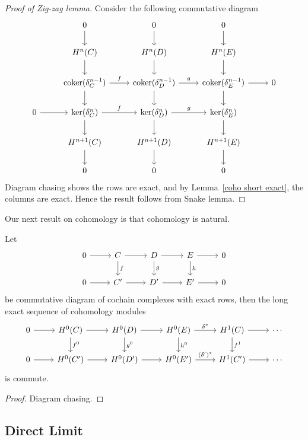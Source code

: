 \begin{proof}[Proof of Zig-zag lemma]
    Consider the following commutative diagram
    \[\begin{tikzcd}
        {} & 0 \ar[d] & 0 \ar[d] & 0 \ar[d] & {}\\
        {} & H^n(C) \ar[d] & H^n(D) \ar[d] & H^n(E) \ar[d] & {}\\
        {} & \coker(\delta^{n-1}_C) \ar[r, "f"] \ar[d] & \coker(\delta^{n-1}_D) \ar[r, "g"] \ar[d] & \coker(\delta^{n-1}_E) \ar[r] \ar[d] & 0 \\
        0 \ar[r] & \ker(\delta^n_C) \ar[r, "f"] \ar[d] & \ker(\delta^n_D) \ar[r, "g"] \ar[d] & \ker(\delta^n_E) \ar[d] & {} \\
        {} & H^{n+1}(C) \ar[d] & H^{n+1}(D) \ar[d] & H^{n+1}(E) \ar[d] & {}\\
        {} & 0 & 0 & 0 & {}
    \end{tikzcd}\]
    Diagram chasing shows the rows are exact, and by Lemma~\ref{coho short exact}, the columns are exact.
    Hence the result follows from Snake lemma.
\end{proof}

Our next result on cohomology is that cohomology is natural.

\begin{thm}
    Let
    \[\begin{tikzcd}
        0\ar[r] & C \ar[r]\ar[d, "f"] & D \ar[r]\ar[d, "g"] & E \ar[r]\ar[d, "h"] & 0 \\
        0\ar[r] & C' \ar[r] & D'\ar[r] & E' \ar[r] & 0
    \end{tikzcd}\]
    be commutative diagram of cochain complexes with exact rows, then the long exact sequence of cohomology modules
    \[\begin{tikzcd}
        0 \ar[r] & H^0(C) \ar[r] \ar[d, "f^0"] & H^0(D) \ar[r] \ar[d, "g^0"] & H^0(E) \ar[r, "\delta^*"] \ar[d, "h^0"] & H^1(C) \ar[r] \ar[d, "f^1"] & \cdots\\
        0 \ar[r] & H^0(C') \ar[r] & H^0(D') \ar[r] & H^0(E') \ar[r, "(\delta')^*"] & H^1(C') \ar[r] & \cdots
    \end{tikzcd}\]
    is commute.
\end{thm}
\begin{proof}
    Diagram chasing.
\end{proof}

\subsection*{Direct Limit}

